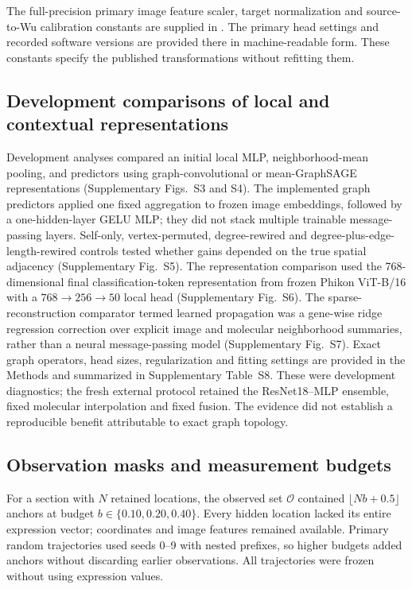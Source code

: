 The full-precision primary image feature scaler, target normalization and source-to-Wu calibration constants are supplied in . The primary head settings and recorded software versions are provided there in machine-readable form. These constants specify the published transformations without refitting them.

\subsection{Development comparisons of local and contextual representations}
Development analyses compared an initial local MLP, neighborhood-mean pooling, and predictors using graph-convolutional\cite{kipf2017} or mean-GraphSAGE\cite{hamilton2017} representations (Supplementary Figs.~S3 and S4). The implemented graph predictors applied one fixed aggregation to frozen image embeddings, followed by a one-hidden-layer GELU MLP; they did not stack multiple trainable message-passing layers. Self-only, vertex-permuted, degree-rewired and degree-plus-edge-length-rewired controls tested whether gains depended on the true spatial adjacency (Supplementary Fig.~S5). The representation comparison used the 768-dimensional final classification-token representation from frozen Phikon ViT-B/16\cite{filiot2023} with a $768\rightarrow256\rightarrow50$ local head (Supplementary Fig.~S6). The sparse-reconstruction comparator termed learned propagation was a gene-wise ridge regression correction over explicit image and molecular neighborhood summaries, rather than a neural message-passing model (Supplementary Fig.~S7). Exact graph operators, head sizes, regularization and fitting settings are provided in the Methods and summarized in Supplementary Table~S8. These were development diagnostics; the fresh external protocol retained the ResNet18--MLP ensemble, fixed molecular interpolation and fixed fusion. The evidence did not establish a reproducible benefit attributable to exact graph topology.

\subsection{Observation masks and measurement budgets}
For a section with $N$ retained locations, the observed set $\mathcal O$ contained $\lfloor Nb+0.5\rfloor$ anchors at budget $b\in\{0.10,0.20,0.40\}$. Every hidden location lacked its entire expression vector; coordinates and image features remained available. Primary random trajectories used seeds 0--9 with nested prefixes, so higher budgets added anchors without discarding earlier observations. All trajectories were frozen without using expression values.

